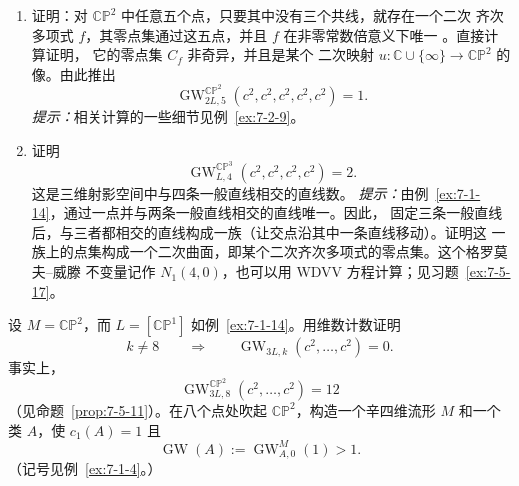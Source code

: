 \begin{exercise}\label{ex:7-1-16}
\begin{enumerate}[label=(\roman*),leftmargin=3em]
\item 证明：对 $\mathbb{CP}^2$ 中任意五个点，只要其中没有三个共线，就存在一个二次
齐次多项式 $f$，其零点集通过这五点，并且 $f$ 在非零常数倍意义下唯一
。直接计算证明，
它的零点集 $C_f$ 非奇异，并且是某个
二次映射 $u:\mathbb C\cup\{\infty\}\to\mathbb{CP}^2$ 的像。由此推出
\[
  \operatorname{GW}^{\mathbb{CP}^2}_{2L,5}(c^2,c^2,c^2,c^2,c^2)=1.
\]
\emph{提示：}相关计算的一些细节见例~\ref{ex:7-2-9}。

\item 证明
\[
  \operatorname{GW}^{\mathbb{CP}^3}_{L,4}(c^2,c^2,c^2,c^2)=2.
\]
这是三维射影空间中与四条一般直线相交的直线数。
\emph{提示：}由例~\ref{ex:7-1-14}，通过一点并与两条一般直线相交的直线唯一。因此，
固定三条一般直线后，与三者都相交的直线构成一族（让交点沿其中一条直线移动）。证明这
一族上的点集构成一个二次曲面，即某个二次齐次多项式的零点集。这个格罗莫夫--威滕
不变量记作 $N_1(4,0)$，也可以用 WDVV 方程计算；见习题~\ref{ex:7-5-17}。
\end{enumerate}
\end{exercise}

\begin{exercise}\label{ex:7-1-17}
设 $M=\mathbb{CP}^2$，而 $L=[\mathbb{CP}^1]$ 如例~\ref{ex:7-1-14}。用维数计数证明
\[
  k\ne8
  \qquad\Longrightarrow\qquad
  \operatorname{GW}_{3L,k}(c^2,\ldots,c^2)=0.
\]
事实上，
\[
  \operatorname{GW}^{\mathbb{CP}^2}_{3L,8}(c^2,\ldots,c^2)=12
\]
（见命题~\ref{prop:7-5-11}）。在八个点处吹起 $\mathbb{CP}^2$，构造一个辛四维流形 $M$ 和一个类
$A$，使 $c_1(A)=1$ 且
\[
  \operatorname{GW}(A):=\operatorname{GW}^{M}_{A,0}(1)>1.
\]
（记号见例~\ref{ex:7-1-4}。）
\end{exercise}
